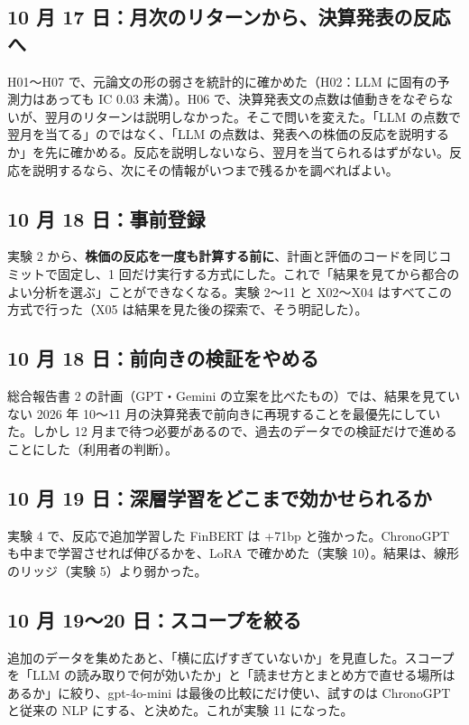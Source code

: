 \subsection{10 月 17 日：月次のリターンから、決算発表の反応へ}

H01〜H07 で、元論文の形の弱さを統計的に確かめた（H02：LLM に固有の予測力はあっても IC 0.03 未満）。H06 で、決算発表文の点数は値動きをなぞらないが、翌月のリターンは説明しなかった。そこで問いを変えた。「LLM の点数で翌月を当てる」のではなく、「LLM の点数は、発表への株価の反応を説明するか」を先に確かめる。反応を説明しないなら、翌月を当てられるはずがない。反応を説明するなら、次にその情報がいつまで残るかを調べればよい。

\subsection{10 月 18 日：事前登録}

実験 2 から、\textbf{株価の反応を一度も計算する前に}、計画と評価のコードを同じコミットで固定し、1 回だけ実行する方式にした。これで「結果を見てから都合のよい分析を選ぶ」ことができなくなる。実験 2〜11 と X02〜X04 はすべてこの方式で行った（X05 は結果を見た後の探索で、そう明記した）。

\subsection{10 月 18 日：前向きの検証をやめる}

総合報告書 2 の計画（GPT・Gemini の立案を比べたもの）では、結果を見ていない 2026 年 10〜11 月の決算発表で前向きに再現することを最優先にしていた。しかし 12 月まで待つ必要があるので、過去のデータでの検証だけで進めることにした（利用者の判断）。

\subsection{10 月 19 日：深層学習をどこまで効かせられるか}

実験 4 で、反応で追加学習した FinBERT は +71bp と強かった。ChronoGPT も中まで学習させれば伸びるかを、LoRA で確かめた（実験 10）。結果は、線形のリッジ（実験 5）より弱かった。

\subsection{10 月 19〜20 日：スコープを絞る}

追加のデータを集めたあと、「横に広げすぎていないか」を見直した。スコープを「LLM の読み取りで何が効いたか」と「読ませ方とまとめ方で直せる場所はあるか」に絞り、gpt-4o-mini は最後の比較にだけ使い、試すのは ChronoGPT と従来の NLP にする、と決めた。これが実験 11 になった。


